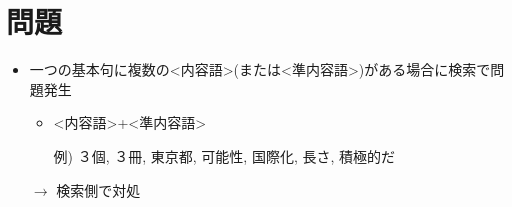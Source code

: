 \documentclass[a4j]{jarticle}
\newcommand{\sm}[1]{\textless #1\textgreater}
\begin{document}








\section{問題}

\begin{itemize}
 \item 一つの基本句に複数の\sm{内容語}(または\sm{準内容語})がある場合に検索で問題発生

       \begin{itemize}
%

	\item \sm{内容語}+\sm{準内容語}

	      例) ３個, ３冊, 東京都, 可能性, 国際化, 長さ, 積極的だ
       \end{itemize}

       $\rightarrow$ 検索側で対処








\end{itemize}
\end{document}
